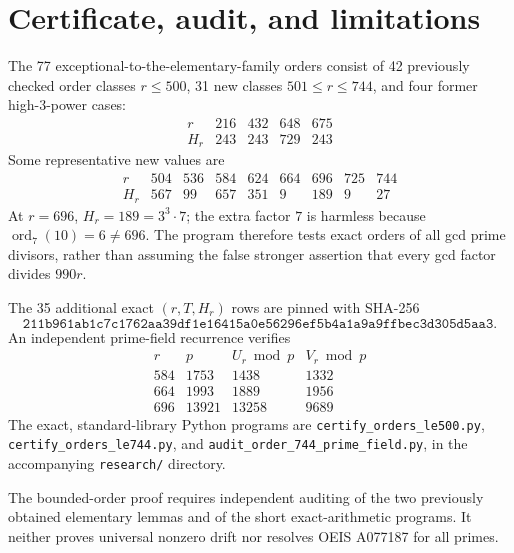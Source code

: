 \documentclass[10pt]{article}
\DeclareMathOperator{\ord}{ord}
\begin{document}
\section{Certificate, audit, and limitations}
The 77 exceptional-to-the-elementary-family orders
consist of 42 previously checked order classes \(r\le500\),
31 new classes \(501\le r\le744\), and four former
high-\(3\)-power cases:
\[
\begin{array}{c|rrrr}
r&216&432&648&675\\\hline
H_r&243&243&729&243
\end{array}
\]
Some representative new values are
\[
\begin{array}{r|rrrrrrrr}
r&504&536&584&624&664&696&725&744\\\hline
H_r&567&99&657&351&9&189&9&27
\end{array}
\]
At \(r=696\), \(H_r=189=3^3\cdot7\);
the extra factor \(7\) is harmless because
\(\ord_7(10)=6\ne696\).
The program therefore tests exact orders of
all gcd prime divisors, rather than assuming the
false stronger assertion that every gcd factor divides
\(990r\).

The 35 additional exact \((r,T,H_r)\) rows are
pinned with SHA-256
\[
\texttt{211b961ab1c7c1762aa39df1e16415a0e56296ef5b4a1a9a9ffbec3d305d5aa3}.
\]
An independent prime-field recurrence verifies
\[
\begin{array}{r|r|r|r}
r&p&U_r\bmod p&V_r\bmod p\\\hline
584&1753&1438&1332\\
664&1993&1889&1956\\
696&13921&13258&9689
\end{array}
\]
The exact, standard-library Python programs are
\texttt{certify\_orders\_le500.py},
\texttt{certify\_orders\_le744.py},
and \texttt{audit\_order\_744\_prime\_field.py},
in the accompanying \texttt{research/} directory.

The bounded-order proof requires independent auditing of
the two previously obtained elementary lemmas and of
the short exact-arithmetic programs.
It neither proves universal nonzero drift
nor resolves OEIS A077187 for all primes.
\end{document}
